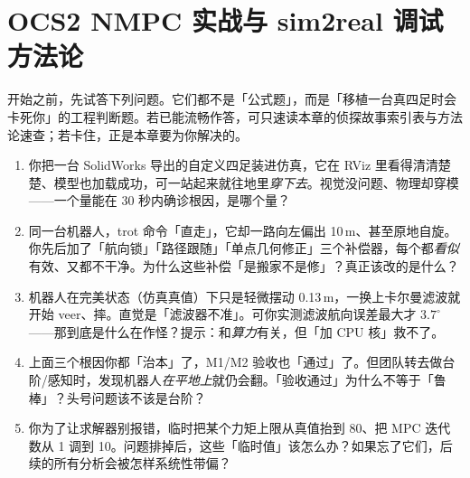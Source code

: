\chapter{OCS2 NMPC 实战与 sim2real 调试方法论}
\label{ch:quad_advanced}


\begin{practice}[前置自测]
开始之前，先试答下列问题。它们都不是「公式题」，而是「移植一台真四足时会卡死你」的工程判断题。若已能流畅作答，可只速读本章的侦探故事索引表与方法论速查；若卡住，正是本章要为你解决的。
\begin{enumerate}
  \item 你把一台 SolidWorks 导出的自定义四足装进仿真，它在 RViz 里看得清清楚楚、模型也加载成功，可一站起来就往地里\emph{穿下去}。视觉没问题、物理却穿模——一个量能在 30 秒内确诊根因，是哪个量？
  \item 同一台机器人，trot 命令「直走」，它却一路向左偏出 10\,m、甚至原地自旋。你先后加了「航向锁」「路径跟随」「单点几何修正」三个补偿器，每个都\emph{看似}有效、又都不干净。为什么这些补偿「是搬家不是修」？真正该改的是什么？
  \item 机器人在完美状态（仿真真值）下只是轻微摆动 0.13\,m，一换上卡尔曼滤波就开始 veer、摔。直觉是「滤波器不准」。可你实测滤波航向误差最大才 $3.7^\circ$——那到底是什么在作怪？提示：和\emph{算力}有关，但「加 CPU 核」救不了。
  \item 上面三个根因你都「治本」了，M1/M2 验收也「通过」了。但团队转去做台阶/感知时，发现机器人\emph{在平地上}就仍会翻。「验收通过」为什么不等于「鲁棒」？头号问题该不该是台阶？
  \item 你为了让求解器别报错，临时把某个力矩上限从真值抬到 80、把 MPC 迭代数从 1 调到 10。问题排掉后，这些「临时值」该怎么办？如果忘了它们，后续的所有分析会被怎样系统性带偏？
\end{enumerate}
\end{practice}


